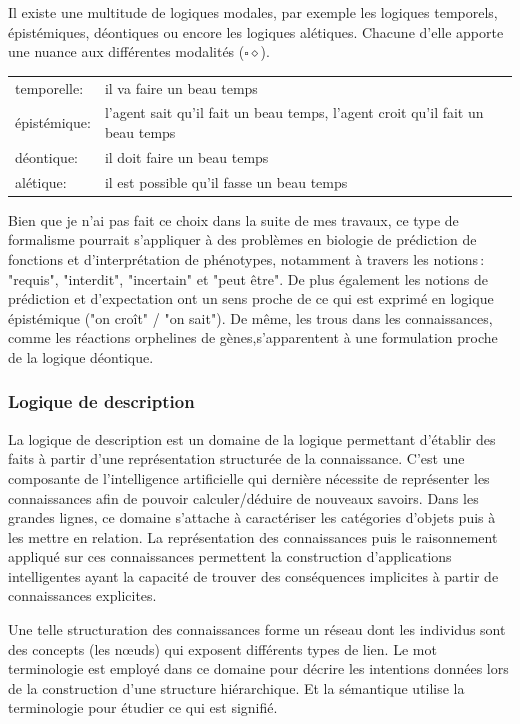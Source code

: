 \begin{refsegment}
    Il existe une multitude de logiques modales, par exemple les logiques temporels, épistémiques, déontiques ou encore les logiques alétiques. Chacune d'elle apporte une nuance aux différentes modalités ($\square \diamond$).
    
    \begin{tabular}{ll}
        temporelle:    & il va faire un beau temps \\
        épistémique:   & l'agent sait qu'il fait un beau temps,  l'agent croit qu'il fait un beau temps \\
        déontique:     & il doit faire un beau temps \\
        alétique:      & il est possible qu'il fasse un beau temps \\
    \end{tabular}

    Bien que je n'ai pas fait ce choix dans la suite  de mes travaux, ce type de formalisme pourrait s’appliquer à des problèmes en biologie de prédiction de fonctions et d’interprétation de phénotypes, notamment à travers les notions : "requis", "interdit", "incertain" et "peut être".  De plus également les notions de prédiction et d'expectation ont un sens proche de ce qui est exprimé en logique épistémique ("on croît" / "on sait"). De même, les trous dans les connaissances, comme les réactions orphelines de gènes,s’apparentent à  une formulation proche de la logique déontique.
    
    
    
    \subsubsection{Logique de description}
    
    La logique de description est un domaine de la logique permettant d'établir des faits à partir d’une représentation structurée de la connaissance. C'est une composante de l'intelligence artificielle qui dernière nécessite de représenter les connaissances afin de pouvoir calculer/déduire de nouveaux savoirs. Dans les grandes lignes, ce domaine s'attache à caractériser les catégories d'objets puis à les mettre en relation. La représentation des connaissances puis le raisonnement appliqué sur ces connaissances permettent la construction d'applications intelligentes ayant la capacité de trouver des conséquences implicites à partir de connaissances explicites.
    
    Une telle structuration des connaissances forme un réseau dont les individus sont des concepts (les nœuds) qui exposent différents types de lien. Le mot terminologie est employé dans ce domaine pour décrire les intentions données lors de la construction d'une structure hiérarchique. Et la sémantique utilise la terminologie pour étudier ce qui est signifié.
    

\end{refsegment}
